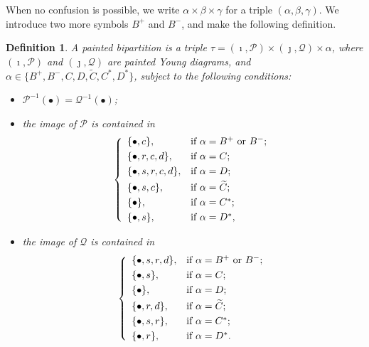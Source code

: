 \documentclass[12pt,a4paper]{amsart}
\newcommand{\CP}{{\mathcal {P}}}
\newcommand{\CQ}{{\mathcal {Q}}}
\numberwithin{equation}{section}
\newtheorem{defn}[thm]{Definition}
\theoremstyle{remark}
\begin{document}
When no confusion is possible, we write $\alpha\times \beta\times \gamma$ for a triple $(\alpha, \beta, \gamma)$.   We introduce two more symbols $B^+$ and $B^-$, and make the following definition.
 \begin{defn}\label{defpbp0}
 A painted bipartition is a triple $\tau=(\imath, \CP)\times (\jmath, \CQ)\times \alpha$, where $(\imath, \CP)$ and $ (\jmath, \CQ)$ are painted Young diagrams, and $\alpha\in \{B^+,B^-, C,D,\widetilde {C}, C^*, D^*\}$, subject to the following conditions:
 \begin{itemize}

 \item
 $\CP^{-1}(\bullet)=\CQ^{-1}(\bullet)$;
 \item
 the image of $\CP$ is contained in
 \[
 \left\{
     \begin{array}{ll}
         \{\bullet, c\}, &\hbox{if $\alpha=B^+$ or $B^-$}; \smallskip\\
            \{\bullet,  r, c,d\}, &\hbox{if $\alpha=C$}; \smallskip\\
          \{\bullet, s, r, c,d\}, &\hbox{if $\alpha=D$}; \smallskip\\
            \{\bullet, s, c\}, &\hbox{if $\alpha=\widetilde{ C}$}; \smallskip \\
        \{\bullet\}, &\hbox{if $\alpha=C^*$}; \smallskip \\
          \{\bullet, s\}, &\hbox{if $\alpha=D^*$},\\
            \end{array}
   \right.
 \]
 \item
 the image of $\CQ$ is contained in
 \[
 \left\{
     \begin{array}{ll}
         \{\bullet, s, r, d\}, &\hbox{if $\alpha=B^+$ or $B^-$}; \smallskip\\
           \{\bullet, s\}, &\hbox{if $\alpha=C$}; \smallskip\\
           \{\bullet\}, &\hbox{if $\alpha=D$}; \smallskip\\
             \{\bullet, r, d\}, &\hbox{if $\alpha=\widetilde{ C}$}; \smallskip\\
        \{\bullet, s,r\}, &\hbox{if $\alpha=C^*$}; \smallskip \\
          \{\bullet, r\}, &\hbox{if $\alpha=D^*$}.
            \end{array}
   \right.
 \]

 \end{itemize}
 \end{defn}
\end{document}

